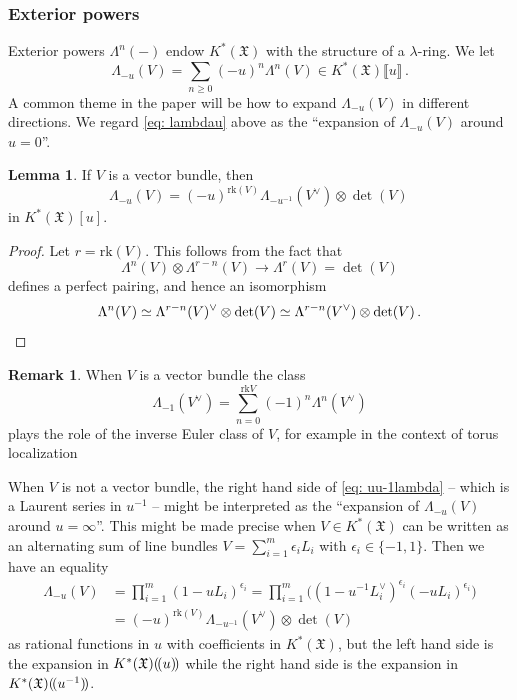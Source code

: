 \documentclass[12pt]{amsart}
\theoremstyle{definition}
\newtheorem{lemma}[definition]{Lemma}
\newtheorem{remark}[definition]{Remark}
\newcommand{\1}{\mathbf 1}
\newcommand{\FX}{{\mathfrak{X}}}
\newcommand{\lpp}{(\hspace{-0.15em}(}
\newcommand{\rpp}{)\hspace{-0.15em})}
\newcommand{\rk}{\mathrm{rk}}
\begin{document}
\subsubsection{Exterior powers}\label{subsubsec: alternating}
\label{subsubsec: exterior}

Exterior powers $\Lambda^n(-)$ endow $K^\ast(\FX)$ with the structure of a $\lambda$-ring. We let
\begin{equation}\label{eq: lambdau}
    \Lambda_{-u}(V)=\sum_{n\geq 0}(-u)^n\Lambda^n(V)\in K^\ast(\FX)\llbracket u \rrbracket\,.\end{equation}
A common theme in the paper will be how to expand $\Lambda_{-u}(V)$ in different directions. We regard \eqref{eq: lambdau} above as the ``expansion of $\Lambda_{-u}(V)$ around $u=0$''. 

\begin{lemma}\label{lem: symmetryVB}
    If $V$ is a vector bundle, then 
    \begin{equation}
        \label{eq: uu-1lambda}
    \Lambda_{-u}(V)=(-u)^{\rk(V)}\Lambda_{-u^{-1}}(V^\vee)\otimes \det(V)\,\end{equation}
    in $K^\ast(\FX)[u]$.
\end{lemma}
\begin{proof}
Let $r=\rk(V)$. This follows from the fact that
\[\Lambda^n(V)\otimes \Lambda^{r-n}(V)\to \Lambda^r(V)=\det(V)\]
defines a perfect pairing, and hence an isomorphism
\[\Lambda^n(V)\simeq \Lambda^{r-n}(V)^\vee\otimes \det(V)\simeq \Lambda^{r-n}(V^\vee)\otimes \det(V)\,.\qedhere\]
\end{proof}
\begin{remark}\label{rmk: inverseeulerclass}
    When $V$ is a vector bundle the class
    \[\Lambda_{-1}(V^\vee)=\sum_{n=0}^{\rk V}(-1)^n\Lambda^n(V^\vee)\]
    plays the role of the inverse Euler class of $V$, for example in the context of torus localization  \cite[Section 2.3]{okounkovlecturesK}
\end{remark}


When $V$ is not a vector bundle, the right hand side of \eqref{eq: uu-1lambda} -- which is a Laurent series in $u^{-1}$ -- might be interpreted as the ``expansion of $\Lambda_{-u}(V)$ around $u=\infty$''. This might be made precise when $V\in K^\ast(\FX)$ can be written as an alternating sum of line bundles $V=\sum_{i=1}^m \epsilon_i L_i$ with $\epsilon_i\in \{-1,1\}$. Then we have an equality 
\begin{align*}\label{eq: lineTSigma}
\Lambda_{-u}(V)&=\prod_{i=1}^m (1-u L_i)^{\epsilon_i}=\prod_{i=1}^m\big( (1-u^{-1} L_i^\vee)^{\epsilon_i}(-uL_i)^{\epsilon_i}\big)\\
&=(-u)^{\rk(V)}\Lambda_{-u^{-1}}(V^\vee)\otimes \det(V)
\end{align*}
as rational functions in $u$ with coefficients in $K^\ast(\FX)$, but the left hand side is the expansion in $K^\ast(\FX)\lpp u \rpp$ while the right hand side is the expansion in $K^\ast(\FX)\lpp u^{-1}\rpp$. 
\end{document}
